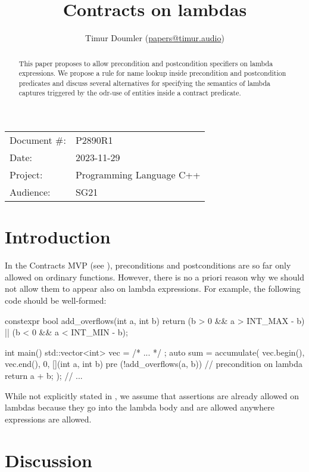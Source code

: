 


\title{Contracts on lambdas}
\author{ Timur Doumler \small(\href{mailto:papers@timur.audio}{papers@timur.audio})}
\date{}
\maketitle

\begin{tabular}{ll}
Document \#: & P2890R1 \\
Date: &2023-11-29 \\
Project: & Programming Language C++ \\
Audience: & SG21
\end{tabular}

\begin{abstract}
This paper proposes to allow precondition and postcondition specifiers on lambda expressions. We propose a rule for name lookup inside precondition and postcondition predicates and discuss several alternatives for specifying the semantics of lambda captures triggered by the odr-use of entities inside a contract predicate.
\end{abstract}

\section{Introduction}
\label{sec:intro}

In the Contracts MVP (see \cite{P2900R2}), preconditions and postconditions are so far only allowed on ordinary functions. However, there is no a priori reason why we should not allow them to appear also on lambda expressions. For example, the following code should be well-formed:
\begin{codeblock}
constexpr bool add_overflows(int a, int b) {
  return (b > 0 && a > INT_MAX - b) || (b < 0 && a < INT_MIN - b);
}

int main() {
  std::vector<int> vec = { /* ... */ };
  auto sum = accumulate(
    vec.begin(), vec.end(), 0, 
    [](int a, int b) 
      pre (!add_overflows(a, b))  // precondition on lambda
    {
      return a + b;
    });
  // ...
}
\end{codeblock}

While not explicitly stated in \cite{P2900R2}, we assume that assertions are already allowed on lambdas because they go into the lambda body and are allowed anywhere expressions are allowed.

\section{Discussion}
